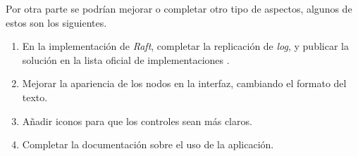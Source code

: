Por otra parte se podrían mejorar o completar otro tipo de aspectos, algunos de estos son los siguientes.

\begin{enumerate}
\item En la implementación de \textit{Raft}, completar la replicación de \textit{log}, y publicar la solución en la lista oficial de implementaciones \cite{raft1}.

\item Mejorar la apariencia de los nodos en la interfaz, cambiando el formato del texto.

\item Añadir iconos para que los controles sean más claros.

\item Completar la documentación sobre el uso de la aplicación.
\end{enumerate}
